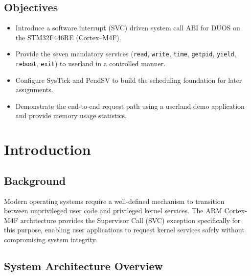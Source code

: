 \documentclass[11pt,a4paper]{article}
\begin{document}
\tableofcontents
\newpage



\subsection*{Objectives}
\begin{itemize}[leftmargin=1.5em]
  \item Introduce a software interrupt (SVC) driven system call ABI for DUOS on the STM32F446RE (Cortex--M4F).
  \item Provide the seven mandatory services (\texttt{read}, \texttt{write}, \texttt{time}, \texttt{getpid}, \texttt{yield}, \texttt{reboot}, \texttt{exit}) to userland in a controlled manner.
  \item Configure SysTick and PendSV to build the scheduling foundation for later assignments.
  \item Demonstrate the end-to-end request path using a userland demo application and provide memory usage statistics.
\end{itemize}



\newpage

\section{Introduction}

\subsection{Background}
Modern operating systems require a well-defined mechanism to transition between unprivileged user code and privileged kernel services. The ARM Cortex-M4F architecture provides the Supervisor Call (SVC) exception specifically for this purpose, enabling user applications to request kernel services safely without compromising system integrity.

\subsection{System Architecture Overview}
\end{document}
